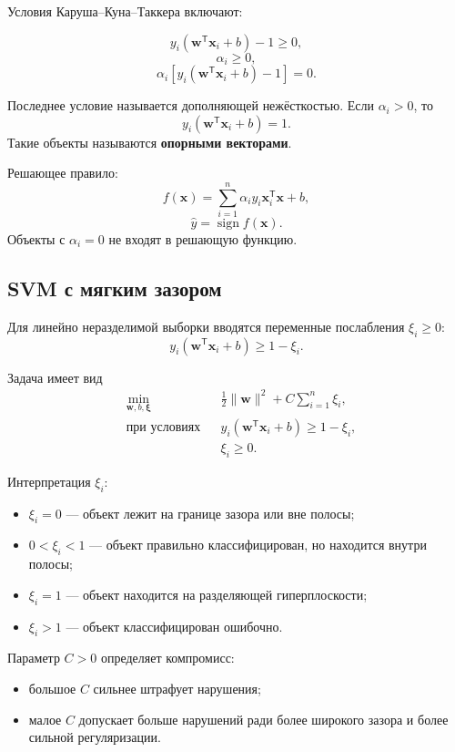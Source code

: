 \documentclass[12pt,a4paper]{article}
\theoremstyle{definition}
\newcommand{\T}{\mathsf{T}}
\newcommand{\1}{\mathbf{1}}
\DeclareMathOperator{\sign}{sign}
\begin{document}
Условия Каруша--Куна--Таккера включают:

\[
    y_i(\bm{w}^{\T}\bm{x}_i+b)-1\geq0,
\]
\[
    \alpha_i\geq0,
\]
\[
    \alpha_i
    \left[
        y_i(\bm{w}^{\T}\bm{x}_i+b)-1
    \right]
    =0.
\]

Последнее условие называется дополняющей нежёсткостью. Если
$\alpha_i>0$, то
\[
    y_i(\bm{w}^{\T}\bm{x}_i+b)=1.
\]
Такие объекты называются \textbf{опорными векторами}.

Решающее правило:
\[
    f(\bm{x})
    =
    \sum_{i=1}^{n}
    \alpha_i y_i
    \bm{x}_i^{\T}\bm{x}
    +
    b,
\]
\[
    \widehat{y}=\sign f(\bm{x}).
\]
Объекты с $\alpha_i=0$ не входят в решающую функцию.

\subsection{SVM с мягким зазором}

Для линейно неразделимой выборки вводятся переменные послабления
$\xi_i\geq0$:
\[
    y_i(\bm{w}^{\T}\bm{x}_i+b)
    \geq
    1-\xi_i.
\]

Задача имеет вид
\[
\boxed{
\begin{aligned}
    &\min_{\bm{w},b,\bm{\xi}}
    &&
    \frac{1}{2}\|\bm{w}\|^2
    +
    C\sum_{i=1}^{n}\xi_i,\\
    &\text{при условиях}
    &&
    y_i(\bm{w}^{\T}\bm{x}_i+b)
    \geq1-\xi_i,\\
    &&
    &\xi_i\geq0.
\end{aligned}
}
\]

Интерпретация $\xi_i$:

\begin{itemize}
    \item $\xi_i=0$ --- объект лежит на границе зазора или вне полосы;
    \item $0<\xi_i<1$ --- объект правильно классифицирован, но находится
    внутри полосы;
    \item $\xi_i=1$ --- объект находится на разделяющей гиперплоскости;
    \item $\xi_i>1$ --- объект классифицирован ошибочно.
\end{itemize}

Параметр $C>0$ определяет компромисс:

\begin{itemize}
    \item большое $C$ сильнее штрафует нарушения;
    \item малое $C$ допускает больше нарушений ради более широкого
    зазора и более сильной регуляризации.
\end{itemize}
\end{document}
